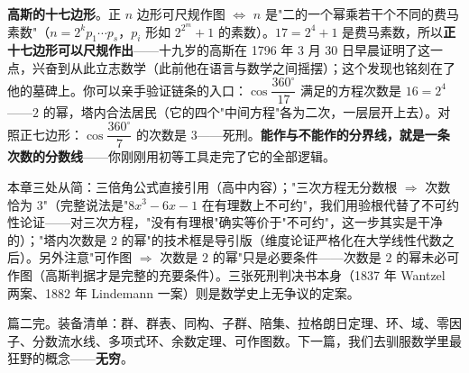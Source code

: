 \begin{shaonao}
\textbf{高斯的十七边形}。正 $n$ 边形可尺规作图 $\iff$ $n$ 是"二的一个幂乘若干个不同的费马素数"（$n = 2^k p_1\cdots p_s$，$p_i$ 形如 $2^{2^m}+1$ 的素数）。$17 = 2^4 + 1$ 是费马素数，所以\textbf{正十七边形可以尺规作出}——十九岁的高斯在 1796 年 3 月 30 日早晨证明了这一点，兴奋到从此立志数学（此前他在语言与数学之间摇摆）；这个发现也铭刻在了他的墓碑上。你可以亲手验证链条的入口：$\cos\dfrac{360^\circ}{17}$ 满足的方程次数是 $16 = 2^4$——$2$ 的幂，塔内合法居民（它的四个"中间方程"各为二次，一层层开上去）。对照正七边形：$\cos\dfrac{360^\circ}{7}$ 的次数是 $3$——死刑。\textbf{能作与不能作的分界线，就是一条次数的分数线}——你刚刚用初等工具走完了它的全部逻辑。
\end{shaonao}

\begin{chengshi}
本章三处从简：三倍角公式直接引用（高中内容）；"三次方程无分数根 $\Rightarrow$ 次数恰为 $3$"（完整说法是"$8x^3-6x-1$ 在有理数上不可约"，我们用验根代替了不可约性论证——对三次方程，"没有有理根"确实等价于"不可约"，这一步其实是干净的）；"塔内次数是 $2$ 的幂"的技术框是导引版（维度论证严格化在大学线性代数之后）。另外注意"可作图 $\Rightarrow$ 次数是 $2$ 的幂"只是必要条件——次数是 $2$ 的幂未必可作图（高斯判据才是完整的充要条件）。三张死刑判决书本身（1837 年 Wantzel 两案、1882 年 Lindemann 一案）则是数学史上无争议的定案。
\end{chengshi}

篇二完。装备清单：群、群表、同构、子群、陪集、拉格朗日定理、环、域、零因子、分数流水线、多项式环、余数定理、可作图数。下一篇，我们去驯服数学里最狂野的概念——\textbf{无穷}。
